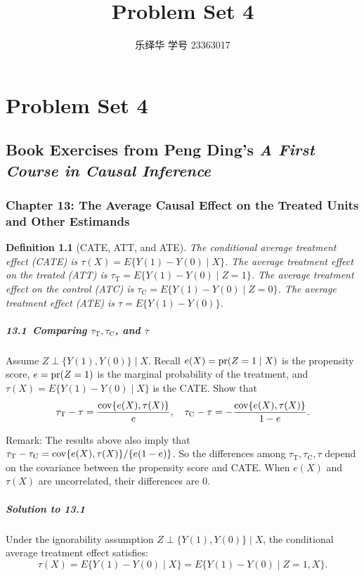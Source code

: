 \documentclass[krantz1]{krantz}
\title{Problem Set 4}
\author{乐绎华 学号 23363017}
\newtheorem{definition}{Definition}
\def\pr{\textup{pr}}
\def\cov{\textup{cov}}
\def\ind{\perp}
\def\Paragraph{\paragraph}
\begin{document}
\maketitle

\chapter{Problem Set 4}

\section{Book Exercises from Peng Ding's \textit{A First Course in Causal Inference}}

\subsection{Chapter 13: The Average Causal Effect on the Treated Units and Other Estimands}


\begin{definition}[CATE, ATT, and ATE]\label{13:def:CATE-ATT}
The conditional average treatment effect (CATE) is $\tau(X) = E\{ Y(1)-Y(0) \mid X \}$.
The average treatment effect on the treated (ATT) is $\tau_\mathrm{T} = E\{ Y(1)-Y(0) \mid Z=1 \}$.
The average treatment effect on the control (ATC) is $\tau_\mathrm{C} = E\{ Y(1)-Y(0) \mid Z=0 \}$.
The average treatment effect (ATE) is $\tau = E\{ Y(1)-Y(0) \}$.
\end{definition}
 \Paragraph{13.1~Comparing $\tau_\mathrm{T}, \tau_\mathrm{C}$, and $\tau$}\label{hw::difference-tau-T-tau}

Assume $Z\ind \{Y(1), Y(0)\} \mid X$. Recall $e(X) = \pr(Z=1\mid X)$ is the propensity score, $e = \pr(Z=1)$ is the marginal probability of the treatment, and $\tau(X) = E\{Y(1)-Y(0) \mid X\}$ is the CATE.
Show that
$$
\tau_\mathrm{T} - \tau = \frac{\cov\{e(X), \tau(X)\}}{e},\quad
\tau_\mathrm{C} - \tau = - \frac{\cov\{e(X), \tau(X)\}}{1-e}.
$$

Remark: The results above also imply that $\tau_\mathrm{T} - \tau_\mathrm{C} = \cov\{e(X), \tau(X)\} / \{e(1-e)\}$. So the differences among $\tau_\mathrm{T}, \tau_\mathrm{C}, \tau$ depend on the covariance between the propensity score and CATE. When $e(X)$ and $\tau(X)$ are uncorrelated, their differences are 0.

\Paragraph{Solution to 13.1}

Under the ignorability assumption $Z \ind \{Y(1), Y(0)\} \mid X$, the conditional average treatment effect satisfies:
\begin{equation*}
    \tau(X) = E\{Y(1) - Y(0) \mid X\} = E\{Y(1) - Y(0) \mid Z=1, X\}.
\end{equation*}
\end{document}

